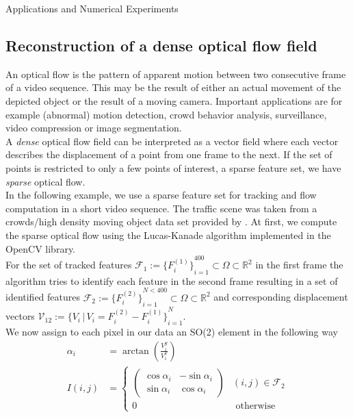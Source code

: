 \begin{chapter}{Applications and Numerical Experiments}
\FloatBarrier
\subsection{Reconstruction of a dense optical flow field} %
\label{sub:reconstructionDenseOpticalFlow}
An optical flow is the pattern of apparent motion between two consecutive frame of a video sequence. This may be the result of either an actual movement of the depicted object
or the result of a moving camera. Important applications are for example (abnormal) motion detection, crowd behavior analysis, surveillance, video compression or image segmentation.\\
A \emph{dense} optical flow field can be interpreted as a vector field where each vector describes the displacement of a point from one frame to the next. If
the set of points is restricted to only a few points of interest, a sparse feature set, we have \emph{sparse} optical flow.\\

In the following example, we use a sparse feature set for tracking and flow computation in a short video sequence. The traffic scene was taken from a crowds/high density moving object data 
set provided by \cite{AliShah}. At first, we compute the sparse optical flow using the Lucas-Kanade algorithm \cite{LucasKanade} implemented in the OpenCV library. \\
For the set of tracked features 
$\mathcal{F}_1:=\lbrace{F^{(1)}_i\rbrace}_{i=1}^{400}\subset\Omega\subset\mathbb{R}^2$ in the first frame the algorithm tries to identify each feature in the second frame resulting in a set of
identified features $\mathcal{F}_2:=\lbrace{F^{(2)}_i\rbrace}_{i=1}^{N<400}\subset\Omega\subset\mathbb{R}^2$ and corresponding displacement vectors 
$\mathcal{V}_{12}:=\lbrace{V_i\,|\,V_i=F_i^{(2)}-F_i^{(1)}\rbrace}_{i=1}^{N}$.\\

We now assign to each pixel in our data an SO(2) element in the following way
\begin{align}
    \alpha_i &=\arctan\left(\frac{V^y_i}{V^x_i}\right) \\
    I(i,j) &= 
    \begin{cases}
    	\begin{pmatrix}
	    \cos\alpha_i    & -\sin\alpha_i\\
	    \sin\alpha_i    & \cos\alpha_i
	\end{pmatrix} & (i,j)\in \mathcal{F}_{2} \\
	0 & \text{ otherwise}
    \end{cases}
\end{align}


\end{chapter}
